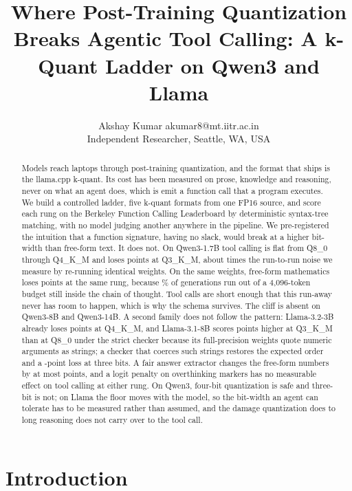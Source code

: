 \documentclass[10pt]{article}
\title{Where Post-Training Quantization Breaks Agentic Tool Calling: A k-Quant Ladder on Qwen3 and Llama}
\author{\name Akshay Kumar \email akumar8@mt.iitr.ac.in \\
      \addr Independent Researcher, Seattle, WA, USA}
\newcommand{\qm}{Qwen3-1.7B}
\begin{document}
\maketitle

\begin{abstract}
Models reach laptops through post-training quantization, and the format that ships is the llama.cpp k-quant. Its cost has been measured on prose, knowledge and reasoning, never on what an agent does, which is emit a function call that a program executes. We build a controlled ladder, five k-quant formats from one FP16 source, and score each rung on the Berkeley Function Calling Leaderboard by deterministic syntax-tree matching, with no model judging another anywhere in the pipeline. We pre-registered the intuition that a function signature, having no slack, would break at a higher bit-width than free-form text. It does not. On \qm{} tool calling is flat from Q8\_0 through Q4\_K\_M and loses \qtDropThree{} points at Q3\_K\_M, about \qtCliffOverNoise{} times the run-to-run noise we measure by re-running identical weights. On the same weights, free-form mathematics loses \qtGsmDropThree{} points at the same rung, because \qtGsmTruncPctThree{}\% of generations run out of a 4{,}096-token budget still inside the chain of thought. Tool calls are short enough that this run-away never has room to happen, which is why the schema survives. The cliff is absent on Qwen3-8B and Qwen3-14B. A second family does not follow the pattern: Llama-3.2-3B already loses \qtDropLlamaThreeBFour{} points at Q4\_K\_M, and Llama-3.1-8B scores \qtDropLlamaEightBThree{} points higher at Q3\_K\_M than at Q8\_0 under the strict checker because its full-precision weights quote numeric arguments as strings; a checker that coerces such strings restores the expected order and a \qtLlamaEightBCoercedDropThree{}-point loss at three bits. A fair answer extractor changes the free-form numbers by at most \qtGsmGapMax{} points, and a logit penalty on overthinking markers has no measurable effect on tool calling at either rung. On Qwen3, four-bit quantization is safe and three-bit is not; on Llama the floor moves with the model, so the bit-width an agent can tolerate has to be measured rather than assumed, and the damage quantization does to long reasoning does not carry over to the tool call.
\end{abstract}

\section{Introduction}
\end{document}
